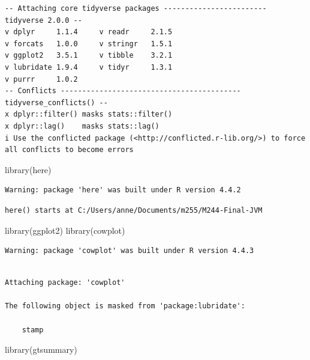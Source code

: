 \documentclass[
  letterpaper,
  DIV=11,
  numbers=noendperiod]{scrartcl}
\newenvironment{Shaded}{\begin{snugshade}}{\end{snugshade}}
\newcommand{\FunctionTok}[1]{\textcolor[rgb]{0.28,0.35,0.67}{#1}}
\newcommand{\NormalTok}[1]{\textcolor[rgb]{0.00,0.23,0.31}{#1}}
\begin{document}
\begin{verbatim}
-- Attaching core tidyverse packages ------------------------ tidyverse 2.0.0 --
v dplyr     1.1.4     v readr     2.1.5
v forcats   1.0.0     v stringr   1.5.1
v ggplot2   3.5.1     v tibble    3.2.1
v lubridate 1.9.4     v tidyr     1.3.1
v purrr     1.0.2     
-- Conflicts ------------------------------------------ tidyverse_conflicts() --
x dplyr::filter() masks stats::filter()
x dplyr::lag()    masks stats::lag()
i Use the conflicted package (<http://conflicted.r-lib.org/>) to force all conflicts to become errors
\end{verbatim}

\begin{Shaded}
\begin{Highlighting}[]
\FunctionTok{library}\NormalTok{(here)}
\end{Highlighting}
\end{Shaded}

\begin{verbatim}
Warning: package 'here' was built under R version 4.4.2
\end{verbatim}

\begin{verbatim}
here() starts at C:/Users/anne/Documents/m255/M244-Final-JVM
\end{verbatim}

\begin{Shaded}
\begin{Highlighting}[]
\FunctionTok{library}\NormalTok{(ggplot2)}
\FunctionTok{library}\NormalTok{(cowplot)}
\end{Highlighting}
\end{Shaded}

\begin{verbatim}
Warning: package 'cowplot' was built under R version 4.4.3
\end{verbatim}

\begin{verbatim}

Attaching package: 'cowplot'

The following object is masked from 'package:lubridate':

    stamp
\end{verbatim}

\begin{Shaded}
\begin{Highlighting}[]
\FunctionTok{library}\NormalTok{(gtsummary)}
\end{Highlighting}
\end{Shaded}
\end{document}
